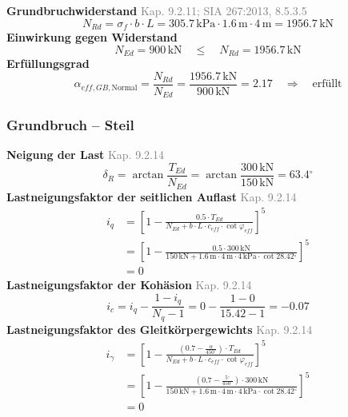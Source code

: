 \documentclass[11pt,a4paper]{article}
\newcommand{\normref}[1]{{\small\textcolor{gray}{#1}}}
\begin{document}
\noindent\textbf{Grundbruchwiderstand} \hfill \normref{Kap. 9.2.11; SIA 267:2013, 8.5.3.5}
\begin{equation*}
N_{Rd} = \sigma_f \cdot b \cdot L = 305.7\,\mathrm{kPa} \cdot 1.6\,\mathrm{m} \cdot 4\,\mathrm{m} = 1956.7\,\mathrm{kN}
\end{equation*}
\noindent\textbf{Einwirkung gegen Widerstand}
\begin{equation*}
N_{Ed} = 900\,\mathrm{kN} \quad \le \quad N_{Rd} = 1956.7\,\mathrm{kN}
\end{equation*}
\noindent\textbf{Erfüllungsgrad}
\begin{equation*}
\alpha_{eff,GB,\text{Normal}} = \frac{N_{Rd}}{N_{Ed}} = \frac{1956.7\,\mathrm{kN}}{900\,\mathrm{kN}} = 2.17 \quad \Rightarrow \quad \text{erfüllt}
\end{equation*}
\subsubsection{Grundbruch – Steil}
\noindent\textbf{Neigung der Last} \hfill \normref{Kap. 9.2.14}
\begin{equation*}
\delta_R = \arctan\frac{T_{Ed}}{N_{Ed}} = \arctan\frac{300\,\mathrm{kN}}{150\,\mathrm{kN}} = 63.4{}^{\circ}
\end{equation*}
\noindent\textbf{Lastneigungsfaktor der seitlichen Auflast} \hfill \normref{Kap. 9.2.14}
\begin{equation*}
\begin{aligned}
  i_q &= \left[1 - \frac{0.5 \cdot T_{Ed}}{N_{Ed} + b \cdot L \cdot c_{eff} \cdot \cot \varphi_{eff}}\right]^{5} \\
  &= \left[1 - \frac{0.5 \cdot 300\,\mathrm{kN}}{150\,\mathrm{kN} + 1.6\,\mathrm{m} \cdot 4\,\mathrm{m} \cdot 4\,\mathrm{kPa} \cdot \cot 28.42{}^{\circ}}\right]^{5} \\
  &= 0
\end{aligned}
\end{equation*}
\noindent\textbf{Lastneigungsfaktor der Kohäsion} \hfill \normref{Kap. 9.2.14}
\begin{equation*}
i_c = i_q - \frac{1 - i_q}{N_q - 1} = 0 - \frac{1 - 0}{15.42 - 1} = -0.07
\end{equation*}
\noindent\textbf{Lastneigungsfaktor des Gleitkörpergewichts} \hfill \normref{Kap. 9.2.14}
\begin{equation*}
\begin{aligned}
  i_{\gamma} &= \left[1 - \frac{\left(0.7 - \frac{\alpha}{450^\circ}\right) \cdot T_{Ed}}{N_{Ed} + b \cdot L \cdot c_{eff} \cdot \cot \varphi_{eff}}\right]^{5} \\
  &= \left[1 - \frac{\left(0.7 - \frac{5{}^{\circ}}{450^\circ}\right) \cdot 300\,\mathrm{kN}}{150\,\mathrm{kN} + 1.6\,\mathrm{m} \cdot 4\,\mathrm{m} \cdot 4\,\mathrm{kPa} \cdot \cot 28.42{}^{\circ}}\right]^{5} \\
  &= 0
\end{aligned}
\end{equation*}
\end{document}
